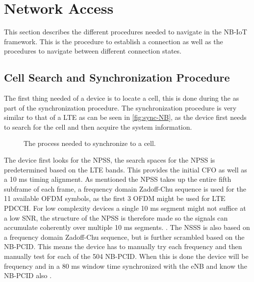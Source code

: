 




\section{Network Access}
\label{sec:Network_access}
This section describes the different procedures needed to navigate in the NB-IoT framework. This is the procedure to establish a connection as well as the procedures to navigate between different connection states. 

\subsection{Cell Search and Synchronization Procedure}
The first thing needed of a device is to locate a cell, this is done during the as part of the synchronization procedure. The synchronization procedure is very similar to that of a \gls{LTE} as can be seen in \autoref{fig:sync-NB}, as the device first needs to search for the cell and then acquire the system information. 


\begin{figure}[H]
\centering

\caption{The process needed to synchronize to a cell.}
\label{fig:sync-NB}
\end{figure}

The device first looks for the \gls{NPSS}, the search spaces for the \gls{NPSS} is predetermined based on the LTE bands.  This provides the initial \gls{CFO} as well as a 10 ms timing alignment. As mentioned the NPSS takes up the entire fifth subframe of each frame, a frequency domain Zadoff-Chu sequence is used for the 11 available \gls{OFDM} symbols, as the first 3 OFDM might be used for LTE PDCCH. For low complexity devices a single 10 ms segment might not suffice at a low \gls{SNR}, the structure of the \gls{NPSS} is therefore made so the signals can accumulate coherently over multiple 10 ms segments. \citep{NB-IoT_Book,primer}. The \gls{NSSS} is also based on a frequency domain Zadoff-Chu sequence, but is further scrambled based on the \gls{NB-PCID}. This means the device has to manually try each frequency and then manually test for each of the 504 NB-PCID. When this is done the device will be frequency and in a 80 ms window time synchronized with the eNB and know the NB-PCID also \citep{NB-IoT_Book,primer}. 

